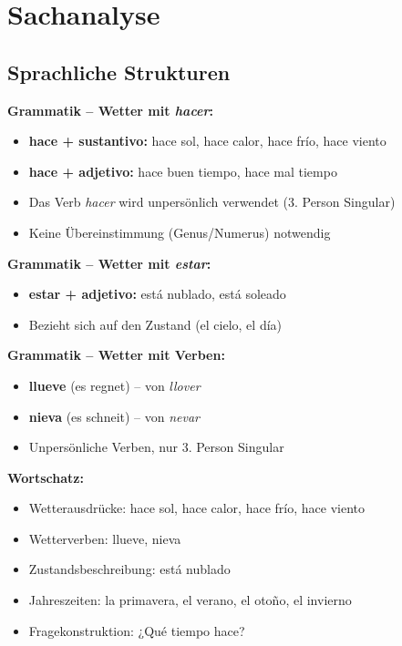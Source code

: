 \documentclass[11pt,a4paper]{article}
\begin{document}
\section{Sachanalyse}

\subsection{Sprachliche Strukturen}

\textbf{Grammatik -- Wetter mit \textit{hacer}:}
\begin{itemize}
    \item \textbf{hace + sustantivo:} hace sol, hace calor, hace frío, hace viento
    \item \textbf{hace + adjetivo:} hace buen tiempo, hace mal tiempo
    \item Das Verb \textit{hacer} wird unpersönlich verwendet (3. Person Singular)
    \item Keine Übereinstimmung (Genus/Numerus) notwendig
\end{itemize}

\textbf{Grammatik -- Wetter mit \textit{estar}:}
\begin{itemize}
    \item \textbf{estar + adjetivo:} está nublado, está soleado
    \item Bezieht sich auf den Zustand (el cielo, el día)
\end{itemize}

\textbf{Grammatik -- Wetter mit Verben:}
\begin{itemize}
    \item \textbf{llueve} (es regnet) -- von \textit{llover}
    \item \textbf{nieva} (es schneit) -- von \textit{nevar}
    \item Unpersönliche Verben, nur 3. Person Singular
\end{itemize}

\textbf{Wortschatz:}
\begin{itemize}
    \item Wetterausdrücke: hace sol, hace calor, hace frío, hace viento
    \item Wetterverben: llueve, nieva
    \item Zustandsbeschreibung: está nublado
    \item Jahreszeiten: la primavera, el verano, el otoño, el invierno
    \item Fragekonstruktion: ¿Qué tiempo hace?
\end{itemize}
\end{document}
